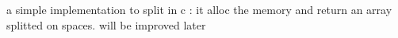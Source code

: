 a simple implementation to split in c \+: it alloc the memory and return an array splitted on spaces. will be improved later 